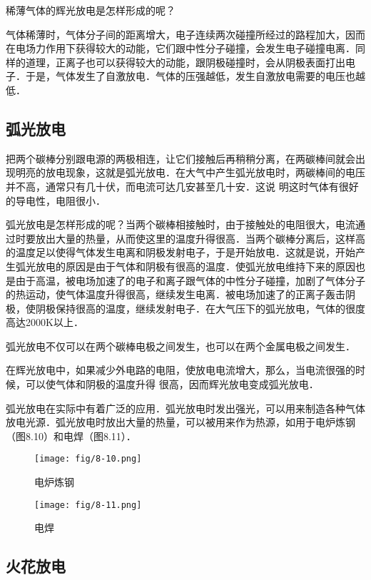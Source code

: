 稀薄气体的辉光放电是怎样形成的呢？

气体稀薄时，气体分子间的距离增大，电子连续两次碰撞所经过的路程加大，因而在电场力作用下获得较大的动能，它们跟中性分子碰撞，会发生电子碰撞电离．同样的道理，正离子也可以获得较大的动能，跟阴极碰撞时，会从阴极表面打出电子．于是，气体发生了自激放电．气体的压强越低，发生自激放电需要的电压也越低．

\subsection{弧光放电} 

把两个碳棒分别跟电源的两极相连，让它们接触后再稍稍分离，在两碳棒间就会出现明亮的放电现象，这就是弧光放电．在大气中产生弧光放电时，两碳棒间的电压并不高，通常只有几十伏，而电流可达几安甚至几十安．这说
明这时气体有很好的导电性，电阻很小．

弧光放电是怎样形成的呢？当两个碳棒相接触时，由于接触处的电阻很大，电流通过时要放出大量的热量，从而使这里的温度升得很高．当两个碳棒分离后，这样高的温度足以使得气体发生电离和阴极发射电子，于是开始放电．这就是说，开始产生弧光放电的原因是由于气体和阴极有很高的温度．使弧光放电维持下来的原因也是由于高温，被电场加速了的电子和离子跟气体的中性分子碰撞，加剧了气体分子的热运动，使气体温度升得很高，继续发生电离．被电场加速了的正离子轰击阴极，使阴极保持很高的温度，继续发射电子．在大气压下的弧光放电，气体的很度高达2000K以上．

弧光放电不仅可以在两个碳棒电极之间发生，也可以在两个金属电极之间发生．

在辉光放电中，如果减少外电路的电阻，使放电电流增大，那么，当电流很强的时候，可以使气体和阴极的温度升得
很高，因而辉光放电变成弧光放电．

弧光放电在实际中有着广泛的应用．弧光放电时发出强光，可以用来制造各种气体放电光源．弧光放电时放出大量的热量，可以被用来作为热源，如用于电炉炼钢（图8.10）和电焊（图8.11）．
\begin{figure}[htp]
\centering
\begin{minipage}[t]{0.48\textwidth}
\centering
\texttt{[image: fig/8-10.png]}
\caption{电炉炼钢}
\end{minipage}
\begin{minipage}[t]{0.48\textwidth}
\centering
\texttt{[image: fig/8-11.png]}
\caption{电焊}
\end{minipage}
\end{figure}

\subsection{火花放电}


